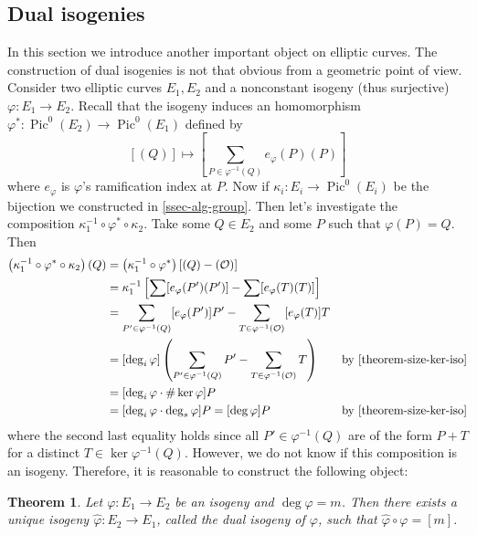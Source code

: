 \documentclass[12pt]{article}
\newtheorem{theorem}{Theorem}[subsection]
\theoremstyle{remark}
\theoremstyle{definition}
\newcommand{\ecO}[0]{\mathcal O}
\newcommand{\kp}[0]{\kappa}
\newcommand{\Pic}[0]{\operatorname{Pic}}
\begin{document}
    \subsection{Dual isogenies}
    In this section we introduce another important object on elliptic curves. The construction of dual isogenies is not that obvious from a geometric point of view. Consider two elliptic curves $E_1, E_2$ and a nonconstant isogeny (thus surjective) $\varphi:E_1\to E_2$. Recall that the isogeny induces an homomorphism $\varphi^*:\Pic^0(E_2)\to\Pic^0(E_1)$ defined by
    \[\left[(Q)\right]\mapsto \left[\sum_{P\in\varphi^{-1}(Q)}e_{\varphi}(P)(P)\right]\]
    where $e_\varphi$ is $\varphi$'s ramification index at $P$. Now if $\kp_i:E_i\to \Pic^0(E_i)$ be the bijection we constructed in \autoref{ssec-alg-group}. Then let's investigate the composition $\kp_1^{-1}\circ\varphi^*\circ\kp_2$. Take some $Q\in E_2$ and some $P$ such that $\varphi(P)=Q$. Then
    \begin{align*}
        \left(\kp_1^{-1}\circ\varphi^*\circ\kp_2\right)(Q)&=\left(\kp_1^{-1}\circ\varphi^*\right)[(Q)-(\ecO)]&\\
        &=\kp_1^{-1}\left[\sum[e_\varphi(P')(P')]-\sum[e_{\varphi}(T)(T)]\right]&\\
        &=\sum_{P'\in \varphi^{-1}(Q)}[e_\varphi(P')]P'-\sum_{T\in \varphi^{-1}(\ecO)}[e_{\varphi}(T)]T&\\
        &=[\deg_i\varphi]\left(\sum_{P'\in\varphi^{-1}(Q)}P'-\sum_{T\in\varphi^{-1}(\ecO)}T\right)&\text{by \autoref{theorem-size-ker-iso}}\\
        &=[\deg_i\varphi\cdot\#\ker\varphi] P&\\
        &=[\deg_i\varphi\cdot\deg_s\varphi]P=[\deg\varphi]P&\text{by \autoref{theorem-size-ker-iso}}
    \end{align*}
    where the second last equality holds since all $P'\in \varphi^{-1}(Q)$ are of the form $P+T$ for a distinct $T\in \ker\varphi^{-1}({Q})$. However, we do not know if this composition is an isogeny. Therefore, it is reasonable to construct the following object:
    \begin{theorem}\label{theorem-dual-iso-exist}
        Let $\varphi:E_1\to E_2$ be an isogeny and $\deg\varphi=m$. Then there exists a unique isogeny $\hat\varphi:E_2\to E_1$, called \textup{the dual isogeny of $\varphi$}, such that $\hat\varphi\circ\varphi=[m]$.
    \end{theorem}
\end{document}
